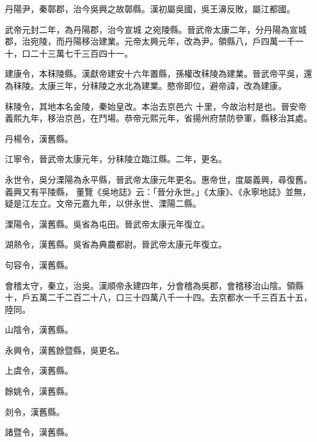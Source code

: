 \begin{pinyinscope}
 丹陽尹，秦鄣郡，治今吳興之故鄣縣。漢初屬吳國，吳王濞反敗，屬江都國。



 武帝元封二年，為丹陽郡，治今宣城
 之宛陵縣。晉武帝太康二年，分丹陽為宣城郡，治宛陵，而丹陽移治建業。元帝太興元年，改為尹。領縣八，戶四萬一千一十，口二十三萬七千三百四十一。



 建康令，本秣陵縣。漢獻帝建安十六年置縣，孫權改秣陵為建業。晉武帝平吳，還為秣陵。太康三年，分秣陵之水北為建業。愍帝即位，避帝諱，改為建康。



 秣陵令，其地本名金陵，秦始皇改。本治去京邑六
 十里，今故治村是也。晉安帝義熙九年，移治京邑，在鬥場。恭帝元熙元年，省揚州府禁防參軍，縣移治其處。



 丹楊令，漢舊縣。



 江寧令，晉武帝太康元年，分秣陵立臨江縣。二年，更名。



 永世令，吳分溧陽為永平縣，晉武帝太康元年更名。惠帝世，度屬義興，尋復舊。義興又有平陵縣，
 董覽《吳地誌》云：「晉分永世。」《太康》、《永寧地誌》並無，疑是江左立。文帝元嘉九年，以併永世、溧陽二縣。



 溧陽令，漢舊縣。吳省為屯田。晉武帝太康元年復立。



 湖熟令，漢舊縣。吳省為典農都尉。晉武帝太康元年復立。



 句容令，漢舊縣。



 會稽太守，秦立，治吳。漢順帝永建四年，分會稽為吳郡，會稽移治山陰。領縣十，戶五萬二千二百二十八，口三十四萬八千一十四。去京都水一千三百五十五，陸同。



 山陰令，漢舊縣。



 永興令，漢舊餘暨縣，吳更名。



 上虞令，漢舊縣。



 餘姚令，漢舊縣。



 剡令，漢舊縣。



 諸暨令，漢舊縣。




\end{pinyinscope}
